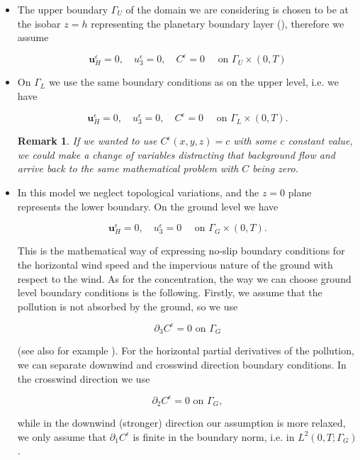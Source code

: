 \documentclass[11pt]{article}
\newtheorem{remark}{Remark}
\begin{document}
  \begin{itemize}
  
    \item The upper boundary $\Gamma_U$ of the domain we are considering is chosen to be at the isobar $z=h$ representing the planetary boundary layer (\cite{arya2001introduction}), therefore we assume
    
    \begin{equation}
      \mathbf{u}^\epsilon_H = 0, \quad u^\epsilon_3 = 0, \quad C^\epsilon = 0 \quad \text{ on } \Gamma_U \times (0,T)
    \end{equation}
      
    \item On $\Gamma_L$ we use the same boundary conditions as on the upper level, i.e. we have
    
    \begin{equation}
      \mathbf{u}^\epsilon_H = 0, \quad u^\epsilon_3 = 0, \quad C^\epsilon = 0  \quad \text{ on } \Gamma_L \times (0,T).
    \end{equation}
    
    
    \begin{remark}
    If we wanted to use $C^\epsilon(x,y,z) = c$ with some $c$ constant value, we could make a change of variables distracting that background flow and arrive back to the same mathematical problem with $C$ being zero.
    \end{remark}
    \item In this model we neglect topological variations, and the $z=0$ plane represents the lower boundary. On the ground level we have
    
    \begin{equation}
      \mathbf{u}^\epsilon_H = 0, \quad u^\epsilon_3 = 0 \quad \text{ on } \Gamma_G \times (0,T) .
    \end{equation}
    
    This is the mathematical way of expressing no-slip boundary conditions for the horizontal wind speed and the impervious nature of the ground with respect to the wind. As for the concentration, the way we can choose ground level boundary conditions is the following. Firstly, we assume that the pollution is not absorbed by the ground, so we use
    
    $$\partial_3 C^\epsilon = 0 \text{ on } \Gamma_G$$
    
    (see also for example \cite{yeh1975three}). For the horizontal partial derivatives of the pollution, we can separate downwind and crosswind direction boundary conditions. In the crosswind direction we use
    
    $$\partial_2 C^\epsilon = 0 \text{ on } \Gamma_G,$$
    
    while in the downwind (stronger) direction our assumption is more relaxed, we only assume that $\partial_1 C^\epsilon$ is finite in the boundary norm, i.e. in $L^2 (0,T; \Gamma_G)$.
  
  \end{itemize}
  
\end{document}
